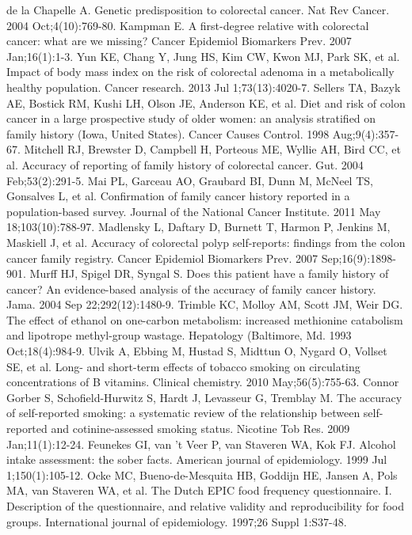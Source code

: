 \begin{thebibliography}{12}
		de la Chapelle A. Genetic predisposition to colorectal cancer. Nat Rev Cancer. 2004 Oct;4(10):769-80.
		Kampman E. A first-degree relative with colorectal cancer: what are we missing? Cancer Epidemiol Biomarkers Prev. 2007 Jan;16(1):1-3.
		Yun KE, Chang Y, Jung HS, Kim CW, Kwon MJ, Park SK, et al. Impact of body mass index on the risk of colorectal adenoma in a metabolically healthy population. Cancer research. 2013 Jul 1;73(13):4020-7.
		Sellers TA, Bazyk AE, Bostick RM, Kushi LH, Olson JE, Anderson KE, et al. Diet and risk of colon cancer in a large prospective study of older women: an analysis stratified on family history (Iowa, United States). Cancer Causes Control. 1998 Aug;9(4):357-67.
		Mitchell RJ, Brewster D, Campbell H, Porteous ME, Wyllie AH, Bird CC, et al. Accuracy of reporting of family history of colorectal cancer. Gut. 2004 Feb;53(2):291-5.
		Mai PL, Garceau AO, Graubard BI, Dunn M, McNeel TS, Gonsalves L, et al. Confirmation of family cancer history reported in a population-based survey. Journal of the National Cancer Institute. 2011 May 18;103(10):788-97.
		Madlensky L, Daftary D, Burnett T, Harmon P, Jenkins M, Maskiell J, et al. Accuracy of colorectal polyp self-reports: findings from the colon cancer family registry. Cancer Epidemiol Biomarkers Prev. 2007 Sep;16(9):1898-901.
		Murff HJ, Spigel DR, Syngal S. Does this patient have a family history of cancer? An evidence-based analysis of the accuracy of family cancer history. Jama. 2004 Sep 22;292(12):1480-9.
		Trimble KC, Molloy AM, Scott JM, Weir DG. The effect of ethanol on one-carbon metabolism: increased methionine catabolism and lipotrope methyl-group wastage. Hepatology (Baltimore, Md. 1993 Oct;18(4):984-9.
		Ulvik A, Ebbing M, Hustad S, Midttun O, Nygard O, Vollset SE, et al. Long- and short-term effects of tobacco smoking on circulating concentrations of B vitamins. Clinical chemistry. 2010 May;56(5):755-63.
		Connor Gorber S, Schofield-Hurwitz S, Hardt J, Levasseur G, Tremblay M. The accuracy of self-reported smoking: a systematic review of the relationship between self-reported and cotinine-assessed smoking status. Nicotine Tob Res. 2009 Jan;11(1):12-24.
		Feunekes GI, van 't Veer P, van Staveren WA, Kok FJ. Alcohol intake assessment: the sober facts. American journal of epidemiology. 1999 Jul 1;150(1):105-12.
		Ocke MC, Bueno-de-Mesquita HB, Goddijn HE, Jansen A, Pols MA, van Staveren WA, et al. The Dutch EPIC food frequency questionnaire. I. Description of the questionnaire, and relative validity and reproducibility for food groups. International journal of epidemiology. 1997;26 Suppl 1:S37-48.

\end{thebibliography}
